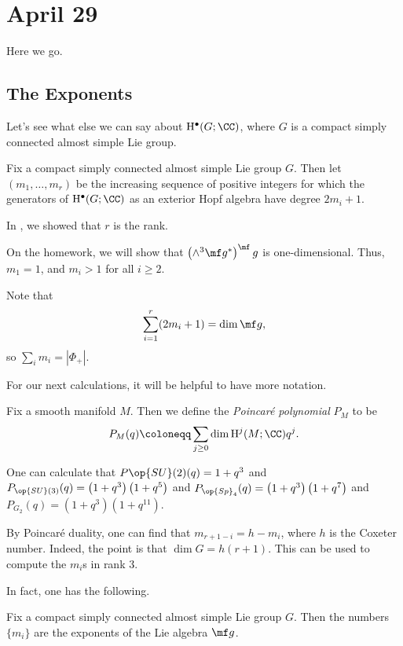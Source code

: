 \documentclass[../notes.tex]{subfiles}
\begin{document}
\section{April 29}
Here we go.

\subsection{The Exponents}
Let's see what else we can say about $\mathrm H^\bullet(G;\CC)$, where $G$ is a compact simply connected almost simple Lie group.
\begin{notation}
	Fix a compact simply connected almost simple Lie group $G$. Then let $(m_1,\ldots,m_r)$ be the increasing sequence of positive integers for which the generators of $\mathrm H^\bullet(G;\CC)$ as an exterior Hopf algebra have degree $2m_i+1$.
\end{notation}
\begin{remark} \label{rem:number-of-gens}
	In , we showed that $r$ is the rank.
\end{remark}
\begin{example}
	On the homework, we will show that $\left(\land^3\mf g^*\right)^\mf g$ is one-dimensional. Thus, $m_1=1$, and $m_i>1$ for all $i\ge2$.
\end{example}
\begin{remark}
	Note that
	\[\sum_{i=1}^r(2m_i+1)=\dim\mf g,\]
	so $\sum_im_i=\left|\Phi_+\right|$.
\end{remark}
For our next calculations, it will be helpful to have more notation.
\begin{definition}
	Fix a smooth manifold $M$. Then we define the \textit{Poincar\'e polynomial} $P_M$ to be
	\[P_M(q)\coloneqq\sum_{j\ge0}\dim\mathrm H^j(M;\CC)q^j.\]
\end{definition}
\begin{example}
	One can calculate that $P{\op{SU}(2)}(q)=1+q^3$ and $P_{\op{SU}(3)}(q)=\left(1+q^3\right)\left(1+q^5\right)$ and $P_{\op{Sp}_4}(q)=\left(1+q^3\right)\left(1+q^7\right)$ and $P_{G_2}(q)=\left(1+q^3\right)\left(1+q^{11}\right)$.
\end{example}
\begin{remark}
	By Poincar\'e duality, one can find that $m_{r+1-i}=h-m_i$, where $h$ is the Coxeter number. Indeed, the point is that $\dim G=h(r+1)$. This can be used to compute the $m_i$s in rank $3$.
\end{remark}
In fact, one has the following.
\begin{theorem} \label{thm:get-exps}
	Fix a compact simply connected almost simple Lie group $G$. Then the numbers $\{m_i\}$ are the exponents of the Lie algebra $\mf g$.
\end{theorem}
\end{document}
